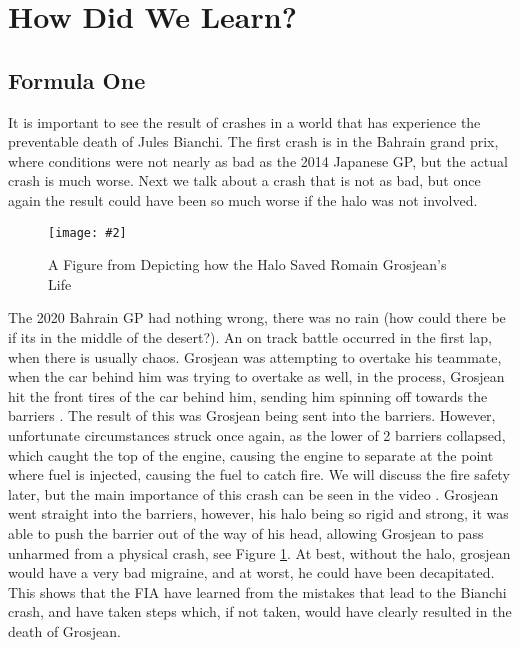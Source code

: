\documentclass[letterpaper, 12pt]{article}
\numberwithin{figure}{section}
\newcommand{\figref}[4]
{
  \begin{figure}[H]
    \centering
    \texttt{[image: \#2]}
    \caption{#3}
    #4
  \end{figure}
}
\begin{document}
\section{How Did We Learn?}

\subsection{Formula One}
It is important to see the result of crashes in a world that has experience the preventable death of Jules Bianchi. The first crash is in the Bahrain grand prix, where conditions were not nearly as bad as the 2014 Japanese GP, but the actual crash is much worse. Next we talk about a crash that is not as bad, but once again the result could have been so much worse if the halo was not involved.

\figref{8}{grosjeancrash}{A Figure from \cite{grosjeancrashsim} Depicting how the Halo Saved Romain Grosjean's Life}{\label{fig:2}}
The 2020 Bahrain GP had nothing wrong, there was no rain (how could there be if its in the middle of the desert?). An on track battle occurred in the first lap, when there is usually chaos. Grosjean was attempting to overtake his teammate, when the car behind him was trying to overtake as well, in the process, Grosjean hit the front tires of the car behind him, sending him spinning off towards the barriers \cite{grosjeanvideo}. The result of this was Grosjean being sent into the barriers. However, unfortunate circumstances struck once again, as the lower of 2 barriers collapsed, which caught the top of the engine, causing the engine to separate at the point where fuel is injected, causing the fuel to catch fire. We will discuss the fire safety later, but the main importance of this crash can be seen in the video \cite{grosjeancrashsim}. Grosjean went straight into the barriers, however, his halo being so rigid and strong, it was able to push the barrier out of the way of his head, allowing Grosjean to pass unharmed from a physical crash, see Figure \ref{fig:2}. At best, without the halo, grosjean would have a very bad migraine, and at worst, he could have been decapitated. This shows that the FIA have learned from the mistakes that lead to the Bianchi crash, and have taken steps which, if not taken, would have clearly resulted in the death of Grosjean.
\end{document}
